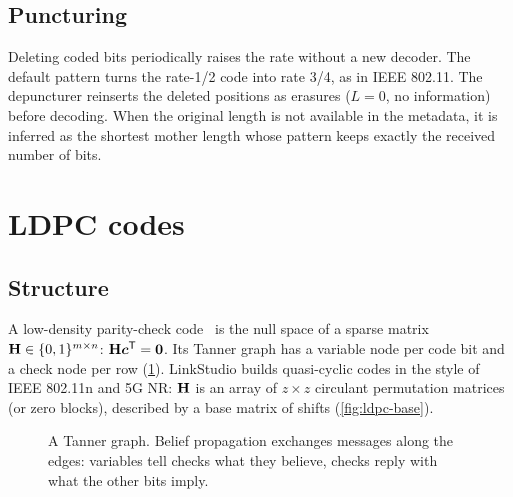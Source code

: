 \subsection{Puncturing}
Deleting coded bits periodically raises the rate without a new decoder. The default pattern
\code{[1,1,1,0,0,1]} turns the rate-1/2 code into rate 3/4, as in IEEE 802.11. The
depuncturer reinserts the deleted positions as erasures ($L=0$, no information) before
decoding. When the original length is not available in the metadata, it is inferred as the
shortest mother length whose pattern keeps exactly the received number of bits.

\section{LDPC codes}\label{sec:ldpc}
\subsection{Structure}
A low-density parity-check code~\cite{gallager1962} is the null space of a sparse matrix $\mathbf{H}\in\{0,1\}^{m\times n}$:
$\mathbf{H}\bm{c}^{\mathsf{T}}=\bm{0}$. Its Tanner graph has a variable node per code bit and a check node per
row (\cref{fig:tanner}). LinkStudio builds quasi-cyclic codes in the style of IEEE 802.11n and 5G
NR: $\mathbf{H}$ is an array of $z\times z$ circulant permutation matrices (or zero blocks), described
by a base matrix of shifts (\cref{fig:ldpc-base}).

\begin{figure}[htbp]
\centering
{}
\caption{A Tanner graph. Belief propagation exchanges messages along the edges: variables tell
checks what they believe, checks reply with what the other bits imply.}
\label{fig:tanner}
\end{figure}

